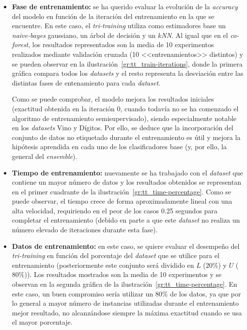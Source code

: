\begin{itemize}
	\item \textbf{Fase de entrenamiento:} se ha querido evaluar la evolución de la \textit{accuracy} del modelo en función de la iteración del entrenamiento en la que se encuentre. En este caso, el \textit{tri-training} utiliza como estimadores base un \textit{naive-bayes} gaussiano, un árbol de decisión y un \textit{$k$NN}. Al igual que en el \textit{co-forest}, los resultados representados son la media de 10 experimentos realizados mediante validación cruzada (10 <<entrenamientos>> distintos) y se pueden observar en la ilustración~\ref{gr:tt_train-iterations}, donde la primera gráfica compara todos los \textit{datasets} y el resto representa la desviación entre las distintas fases de entenamiento para cada \textit{dataset}.
	
	Como se puede comprobar, el modelo mejora los resultados iniciales (exactitud obtenida en la iteración $0$, cuando todavía no se ha comenzado el algoritmo de entrenamiento semisupervisado), siendo especialmente notable en los \textit{datasets} Vino y Dígitos. Por ello, se deduce que la incorporación del conjunto de datos no etiquetado durante el entrenamiento es útil y mejora la hipótesis aprendida en cada uno de los clasificadores base (y, por ello, la general del \textit{ensemble}).
	
	\item \textbf{Tiempo de entrenamiento:} nuevamente se ha trabajado con el \textit{dataset} que contiene un mayor número de datos y los resultados obtenidos se representan en el primer cuadrante de la ilustración~\ref{gr:tt_time-percentage}. Como se puede observar, el tiempo crece de forma aproximadamente lineal con una alta velocidad, requiriendo en el peor de los casos 0.25 segundos para completar el entrenamiento (debido en parte a que este \textit{dataset} no realiza un número elevado de iteraciones durante esta fase).
	
	\item \textbf{Datos de entrenamiento:} en este caso, se quiere evaluar el desempeño del \textit{tri-training} en función del porcentaje del \textit{dataset} que se utilice para el entrenamiento (posteriormente este conjunto será dividido en $L$ ($20\%$) y $U$ ($80\%$)). Los resultados mostrados son la media de 10 experimentos y se observan en la segunda gráfica de la ilustración~\ref{gr:tt_time-percentage}. En este caso, un buen compromiso sería utilizar un $80\%$ de los datos, ya que por lo general a mayor número de instancias utilizadas durante el entrenamiento mejor resultado, no alcanzándose siempre la máxima exactitud cuando se usa el mayor porcentaje.
\end{itemize} 

